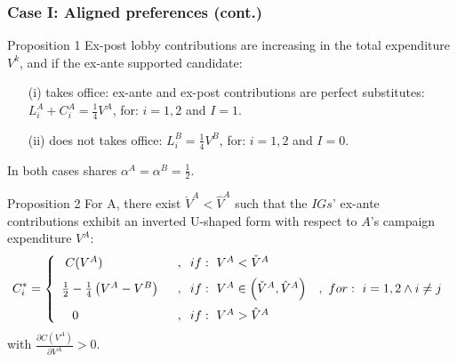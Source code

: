 \documentclass[handout,final,xcolor=dvipsnames]{beamer}
\begin{document}
    \begin{frame}\frametitle{Case I: Aligned preferences (cont.)}
\footnotesize
      \begin{block}{Proposition 1}
Ex-post lobby contributions are increasing in the total expenditure $V^k$, and if the ex-ante supported candidate:
\begin{itemize}
\item[(i)] takes office: ex-ante and ex-post contributions are perfect substitutes: $L^A_i + C^A_i = \frac{1}{4} V^A$, for: $i=1,2$ and $I=1$.  
\item[(ii)] does not takes office: $L^B_i = \frac{1}{4}  V^B$, for: $i=1,2$ and $I=0$.
\end{itemize}
In both cases shares $\alpha^A= \alpha^B=\frac{1}{2}$.
\end{block}
\begin{block}{Proposition 2}
For A, there exist $\check{V}^A < \hat{V}^A$ such that the $IGs$' ex-ante contributions exhibit an inverted U-shaped form with respect to $A$'s campaign expenditure $V^A$:
\begin{eqnarray} \nonumber
C^{*}_{i} = \left\{ \begin{array}{lll}
\vspace{2 mm}
\hspace{1 mm} C(V^A) & \hspace{2 mm} , \hspace{2 mm} if:\ V^A < \check{V}^A \\
\vspace{2 mm}
\frac{1}{2} - \frac{1}{4}  \left(  V^A -  V^B \right)  &  \hspace{2 mm} , \hspace{2 mm} if:\ V^A \in \left( \check{V}^A , \hat{V}^A  \right) & , \ for: \ i=1,2 \wedge i \neq j \\
\hspace{ 3 mm} 0 & \hspace{2 mm} , \hspace{2 mm} if:\ V^A > \hat{V}^A \\
 \end{array}
    \right.  
\end{eqnarray}
with $\frac{\partial C(V^A)}{\partial V^A} > 0$. 
\end{block}
  \end{frame}
\end{document}
